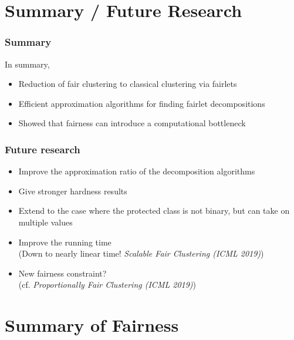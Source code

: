 \documentclass{beamer}
\begin{document}

\section{Summary / Future Research}

\begin{frame}
\frametitle{Summary}

In summary, \pause

\begin{itemize}
	\item Reduction of fair clustering to classical clustering via fairlets \pause

	\item Efficient approximation algorithms for finding fairlet decompositions \pause

	\item Showed that fairness can introduce a computational bottleneck
\end{itemize}

\end{frame}


\begin{frame}
\frametitle{Future research}

\begin{itemize}
	\item Improve the approximation ratio of the decomposition algorithms \pause
	\item Give stronger hardness results \pause
	\item Extend to the case where the protected class is not binary, but can take on multiple values \pause
	\item Improve the running time \\
	(Down to nearly linear time! {\it Scalable Fair Clustering (ICML 2019)}) \pause
	\item New fairness constraint? \\
	(cf. {\it Proportionally Fair Clustering (ICML 2019)})
\end{itemize}

\end{frame}


\section{Summary of Fairness}
\end{document}
